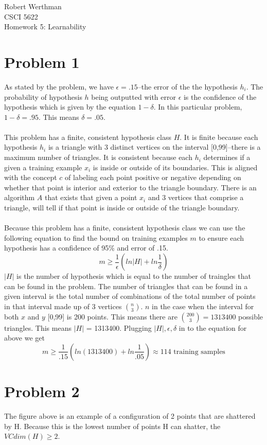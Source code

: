 \documentclass[12pt]{article}
\begin{document}
\noindent
Robert Werthman\\
CSCI 5622\\
Homework 5: Learnability\\

\section*{Problem 1}
As stated by the problem, we have $\epsilon = .15$--the error of the the hypothesis $h_i$.  The probability of hypothesis $h$ being outputted with error $\epsilon$ is the confidence of the hypothesis which is given by the equation $1 - \delta$.  In this particular problem, $1 - \delta = .95$.  This means $\delta = .05$.\\
\\
This problem has a finite, consistent hypothesis class $H$.  It is finite because each hypothesis $h_i$ is a triangle with 3 distinct vertices on the interval [0,99]--there is a maximum number of triangles.  It is consistent because each $h_i$ determines if a given a training example $x_i$ is inside or outside of its boundaries.  This is aligned with the concept $c$ of labeling each point positive or negative depending on whether that point is interior and exterior to the triangle boundary.  There is an algorithm $A$ that exists that given a point $x_i$ and 3 vertices that comprise a triangle, will tell if that point is inside or outside of the triangle boundary.\\
\\
Because this problem has a finite, consistent hypothesis class we can use the following equation to find the bound on training examples $m$ to ensure each hypothesis has a confidence of 95\% and error of .15.
\[
m \ge \frac{1}{\epsilon}(ln|H| + ln\frac{1}{\delta})
\]  
$|H|$ is the number of hypothesis which is equal to the number of traingles that can be found in the problem.  The number of triangles that can be found in a given interval is the total number of combinations of the total number of points in that interval made up of 3 vertices $\binom{n}{3}$.  $n$ in the case when the interval for both $x$ and $y$ [0,99] is 200 points.  This means there are $\binom{200}{3} = 1313400$ possible triangles.  This means $|H|$ = 1313400.  Plugging $|H|, \epsilon, \delta$ in to the equation for above we get
\[
m \ge \frac{1}{.15}(ln(1313400) + ln\frac{1}{.05}) \approx 114 \text{ training samples}
\]

\section*{Problem 2}
\begin{figure}[H]
\centering
\centering
\end{figure}
The figure above is an example of a configuration of 2 points that are shattered by H.  Because this is the lowest number of points H can shatter, the $VCdim(H) \ge 2$. 
\end{document}
